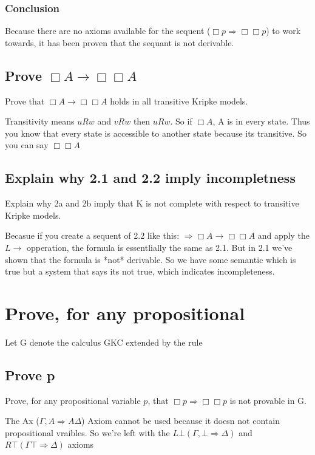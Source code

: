 \documentclass{article}
\begin{document}
\subsubsection{Conclusion}
Because there are no axioms available for the sequent
($\Box p \Rightarrow \Box \Box p$) to work towards, it has been
proven that the sequant is not derivable.

\subsection{Prove $\Box A \to \Box \Box A$ }
Prove that $\Box A \to \Box \Box A$ holds in all transitive Kripke models.

Transitivity means $uRw$ and $vRw$ then $uRw$. So if $\Box A$, A is in every
state. Thus you know that every state is accessible to another state because
its transitive. So you can say $\Box \Box A$

\subsection{Explain why 2.1 and 2.2 imply incompletness}
Explain why 2a and 2b imply that K is not complete with respect to
transitive Kripke models.

Becasue if you create a sequent of 2.2 like this:
$\Rightarrow \Box A \to \Box \Box A$ and apply the $L\to$ opperation,
the formula is essentlially the same as 2.1. But in 2.1 we've shown
that the formula is *not* derivable. So we have some semantic which is
true but a system that says its not true, which indicates incompleteness.

\section{Prove, for any propositional}
Let G denote the calculus GKC extended by the rule
\begin{prooftree}
\end{prooftree}
\subsection{Prove p}
Prove, for any propositional variable $p$,
that $\Box p \Rightarrow \Box \Box p$ is not provable in G.

The Ax ($\Gamma, A \Rightarrow A \Delta$) Axiom cannot be used because it
doesn not contain propositional vraibles. So we're left with the
$L\bot(\Gamma, \bot \Rightarrow \Delta)$ and $R\top(\Gamma \top
\Rightarrow \Delta)$ axioms
\end{document}
